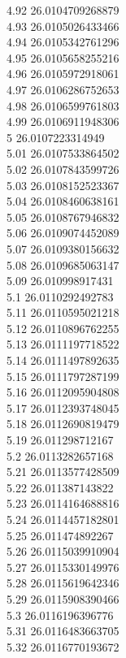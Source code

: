 {4.92	26.0104709268879\\
4.93	26.0105026433466\\
4.94	26.0105342761296\\
4.95	26.0105658255216\\
4.96	26.0105972918061\\
4.97	26.0106286752653\\
4.98	26.0106599761803\\
4.99	26.0106911948306\\
5	26.0107223314949\\
5.01	26.0107533864502\\
5.02	26.0107843599726\\
5.03	26.0108152523367\\
5.04	26.0108460638161\\
5.05	26.0108767946832\\
5.06	26.0109074452089\\
5.07	26.0109380156632\\
5.08	26.0109685063147\\
5.09	26.010998917431\\
5.1	26.0110292492783\\
5.11	26.0110595021218\\
5.12	26.0110896762255\\
5.13	26.0111197718522\\
5.14	26.0111497892635\\
5.15	26.0111797287199\\
5.16	26.0112095904808\\
5.17	26.0112393748045\\
5.18	26.0112690819479\\
5.19	26.011298712167\\
5.2	26.0113282657168\\
5.21	26.0113577428509\\
5.22	26.011387143822\\
5.23	26.0114164688816\\
5.24	26.0114457182801\\
5.25	26.011474892267\\
5.26	26.0115039910904\\
5.27	26.0115330149976\\
5.28	26.0115619642346\\
5.29	26.0115908390466\\
5.3	26.0116196396776\\
5.31	26.0116483663705\\
5.32	26.0116770193672\\
}
